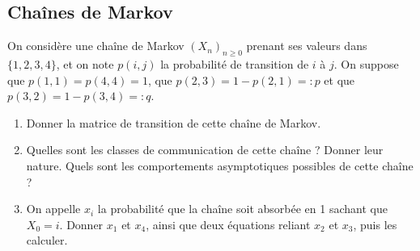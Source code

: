 \subsection{Chaînes de Markov}

\begin{exercise} \label{exo:ChaineMarkov}
  On considère une chaîne de Markov $(X_n)_{n \geq 0}$ prenant ses valeurs dans $\{1, 2, 3, 4\}$, et on note $p(i, j)$ la probabilité de transition de $i$ à $j$. On suppose que $p(1, 1) = p(4, 4) = 1$, que $p(2, 3) = 1 - p(2, 1) =: p$ et que $p(3, 2) = 1 - p(3, 4) =: q$.
  \begin{enumerate}
   \item Donner la matrice de transition de cette chaîne de Markov.
   \item Quelles sont les classes de communication de cette chaîne ? Donner leur nature. Quels sont les comportements asymptotiques possibles de cette chaîne ?
   \item On appelle $x_i$ la probabilité que la chaîne soit absorbée en 1 sachant que $X_0 = i$. Donner $x_1$ et $x_4$, ainsi que deux équations reliant $x_2$ et $x_3$, puis les calculer.
  \end{enumerate}
\end{exercise}

